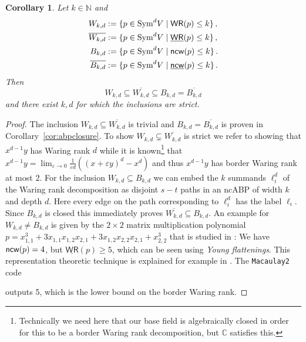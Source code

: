 \documentclass[10pt,a4paper]{article}
\numberwithin{equation}{section}
\newtheorem{corollary}[equation]{Corollary}
\theoremstyle{definition}
\newcommand{\Sym}{\textup{Sym}}
\newcommand{\IC}{\mathbb{C}}
\newcommand{\IN}{\mathbb{N}}
\newcommand{\ncw}{\textup{\textsf{ncw}}}
\newcommand{\WR}{{\mathsf{WR}}}
\newcommand{\WRbar}{\underline{\mathsf{WR}}}
\begin{document}
\begin{corollary}
    Let $k \in \IN$ and
    \begin{align*}
        W_{k,d} &:= \{p \in \Sym^d V \mid \WR(p) \leq k\}\,,\\
        \overline{W_{k,d}} &:= \{p \in \Sym^d V \mid \WRbar(p) \leq k\}\,,\\
        B_{k,d} &:= \{p \in \Sym^d V \mid \ncw(p) \leq k\}\,.\\
        \overline{B_{k,d}} &:= \{p \in \Sym^d V \mid \underline{\ncw}(p) \leq k\}\,.\\
    \end{align*}
    Then
    \[
        W_{k, d} \subseteq \overline{W_{k, d}} \subseteq B_{k,d} = \overline{B_{k,d}}
    \]
and there exist $k,d$ for which the inclusions are strict.
\end{corollary}
\begin{proof}
    The inclusion $W_{k, d} \subseteq \overline{W_{k, d}}$ is trivial and $B_{k,d} = \overline{B_{k,d}}$ is proven in Corollary~\ref{cor:abpclosure}.
    To show $W_{k, d} \subsetneq \overline{W_{k, d}}$ is strict we refer to \cite{carlini2012solution} showing that $x^{d-1}y$ has Waring rank $d$ while it is known\footnote{Technically we need here that our base field is algebraically closed in order for this to be a border Waring rank decomposition, but $\IC$ satisfies this.} that $x^{d-1}y = \lim_{\varepsilon \to 0}\frac{1}{\varepsilon d}((x+\varepsilon y)^{d} - x^{d})$ and thus $x^{d-1}y$ has border Waring rank at most $2$.
    For the inclusion $W_{k, d} \subseteq B_{k,d}$ we can embed the $k$ summands $\ell_i^d$ of the Waring rank decomposition as disjoint $s-t$ paths in an ncABP of width $k$ and depth $d$.
    Here every edge on the path corresponding to $\ell_i^d$ has the label $\ell_i$.
    Since $B_{k,d}$ is closed this immediately proves $\overline{W_{k, d}} \subseteq B_{k,d}$.
    An example for $W_{k, d} \neq B_{k,d}$ is given by the $2 \times 2$ matrix multiplication polynomial $p=x_{1,1}^3 + 3 x_{1,1}x_{1,2}x_{2,1} + 3 x_{1,2}x_{2,2}x_{2,1} + x_{2,2}^3$ that is studied in \cite{CHILO:18}: We have $\ncw(p)=4$, but $\WRbar(p)\geq 5$, which can be seen using \emph{Young flattenings}. This representation theoretic technique is explained for example in \cite{Far:16}. The \texttt{Macaulay2} code

\smallskip


\smallskip

\noindent outputs 5, which is the lower bound on the border Waring rank.
\end{proof}
\end{document}
